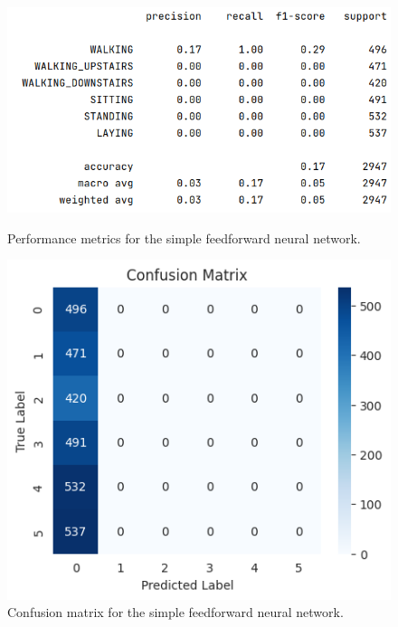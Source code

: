 \begin{figure}[ht]
    \centering
    \begin{minipage}{0.45\textwidth}
        \centering
        \includegraphics[width=\textwidth]{./img/ffnn/simple/performance-metrics}
        \caption{Performance metrics for the simple feedforward neural network.}
        \label{fig:ffnn-simple-performance-metrics}
    \end{minipage}\hfill
    \begin{minipage}{0.45\textwidth}
        \centering
        \includegraphics[width=\textwidth]{./img/ffnn/simple/confusion-matrix}
        \caption{Confusion matrix for the simple feedforward neural network.}
        \label{fig:ffnn-simple-confusion-matrix}
    \end{minipage}
\end{figure}

